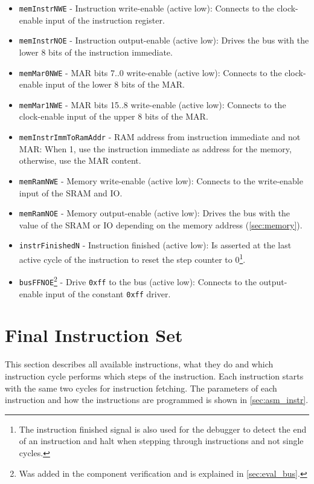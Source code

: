 \begin{itemize}
  \item \texttt{memInstrNWE} - Instruction write-enable (active low): Connects to the clock-enable input of the instruction register.
  \item \texttt{memInstrNOE} - Instruction output-enable (active low): Drives the bus with the lower 8 bits of the instruction immediate.
  \item \texttt{memMar0NWE} - \gls{MAR} bits 7..0 write-enable (active low): Connects to the clock-enable input of the lower 8 bits of the \gls{MAR}.
  \item \texttt{memMar1NWE} - \gls{MAR} bits 15..8 write-enable (active low): Connects to the clock-enable input of the upper 8 bits of the \gls{MAR}.
  \item \texttt{memInstrImmToRamAddr} - \gls{RAM} address from instruction immediate and not \gls{MAR}: When 1, use the instruction immediate as address for the memory, otherwise, use the \gls{MAR} content.
  \item \texttt{memRamNWE} - Memory write-enable (active low): Connects to the write-enable input of the \gls{SRAM} and \gls{IO}.
  \item \texttt{memRamNOE} - Memory output-enable (active low): Drives the bus with the value of the \gls{SRAM} or \gls{IO} depending on the memory address (\cref{sec:memory}).
  \item \texttt{instrFinishedN} - Instruction finished (active low): Is asserted at the last active cycle of the instruction to reset the step counter to 0\footnote{The instruction finished signal is also used for the debugger to detect the end of an instruction and halt when stepping through instructions and not single cycles.}.
  \item \texttt{busFFNOE}\footnote{Was added in the component verification and is explained in \cref{sec:eval_bus}.} - Drive \texttt{0xff} to the bus (active low): Connects to the output-enable input of the constant \texttt{0xff} driver.
\end{itemize}

\section{Final Instruction Set}\label{sec:instructionSet}
This section describes all available instructions, what they do and which instruction cycle performs which steps of the instruction.
Each instruction starts with the same two cycles for instruction fetching.
The parameters of each instruction and how the instructions are programmed is shown in \cref{sec:asm_instr}.
